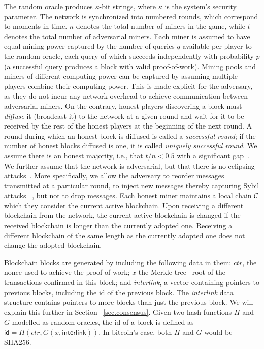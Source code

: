 The random oracle produces $\kappa$-bit strings, where
$\kappa$ is the system's security parameter. The network is synchronized into
numbered rounds, which correspond to moments in time. $n$ denotes the total
number of miners in the game, while $t$ denotes the total number of adversarial
miners. Each miner is assumed to have equal mining power captured by the number
of queries $q$ available per player to the random oracle, each query of which
succeeds independently with probability $p$ (a successful query produces a block
with valid proof-of-work). Mining pools and miners of different computing power
can be captured by assuming multiple players combine their computing power. This
is made explicit for the adversary, as they do not incur any network overhead to
achieve communication between adversarial miners. On the contrary, honest
players discovering a block must \textit{diffuse} it (broadcast it) to the
network at a given round and wait for it to be received by the rest of the
honest players at the beginning of the next round. A round during which an
honest block is diffused is called a \textit{successful round}; if the number of
honest blocks diffused is one, it is called \textit{uniquely successful round}.
We assume there is an honest majority, i.e., that $t / n < 0.5$ with a
significant gap~\cite{backbone}. We further assume that the network is
adversarial, but that there is no eclipsing attacks~\cite{eclipse}. More
specifically, we allow the adversary to reorder messages transmitted at a
particular round, to inject new messages thereby capturing Sybil attacks~
\cite{sybil}, but not to drop messages. Each honest miner maintains a local
chain $\mathcal{C}$ which they consider the current active blockchain. Upon receiving
a different blockchain from the network, the current active blockchain is
changed if the received blockchain is longer than the currently adopted one.
Receiving a different blockchain of the same length as the currently adopted one
does not change the adopted blockchain.

Blockchain blocks are generated by including the following data in them: $ctr$,
the nonce used to achieve the proof-of-work; $x$ the Merkle tree~\cite{merkle} root of the
transactions confirmed in this block; and \textit{interlink}, a vector
containing pointers to previous blocks, including the id of the previous block.
The \textit{interlink} data structure contains pointers to more blocks than just
the previous block. We will explain this further in Section~
\ref{sec.consensus}. Given two hash functions $H$ and $G$ modelled as random
oracles, the id of a block is defined as $\textsf{id} = H(ctr, G(x,
\textsf{interlink}))$. In bitcoin's case, both $H$ and $G$ would be SHA256.

